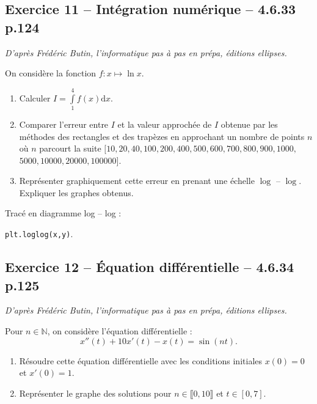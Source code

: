 \documentclass[10pt,fleqn]{article} %
\begin{document}
\begin{multicols}{2}
\subsection*{Exercice 11 -- Intégration numérique -- 4.6.33 p.124}
\begin{flushright}
\textit{D'après Frédéric Butin, l'informatique pas à pas en prépa, éditions ellipses.}
\end{flushright}

On considère la fonction $f:x \mapsto \ln x$.
\begin{enumerate}
\item Calculer $I=\int\limits_1^4 f(x) \text{d}x$.
\item Comparer l'erreur entre $I$ et la valeur approchée de $I$ obtenue par les méthodes des rectangles et des trapèzes en approchant un nombre de points $n$ où $n$ parcourt la suite $[10,20,40,100,200, 400, 500, 600, 700, 800, 900, 1000,$ $5000, 10000, 20000, 100000]$.
\item Représenter graphiquement cette erreur en prenant une échelle $\log$ -- $\log$. Expliquer les graphes obtenus.
\end{enumerate}

\begin{rem}
Tracé en diagramme log -- log :

\texttt{plt.loglog(x,y)}.
\end{rem}

\subsection*{Exercice 12 -- Équation différentielle -- 4.6.34 p.125}
\begin{flushright}
\textit{D'après Frédéric Butin, l'informatique pas à pas en prépa, éditions ellipses.}
\end{flushright}

Pour $n \in \mathbb{N}$, on considère l'équation différentielle : 
$$
x''(t) +10 x'(t) - x(t)=\sin \left( nt \right).
$$
\begin{enumerate}
\item Résoudre cette équation différentielle avec les conditions initiales $x(0)=0$ et $x'(0)=1$.
\item Représenter le graphe des solutions pour $n\in \llbracket 0,10 \rrbracket$ et $t \in[0,7]$.
\end{enumerate}


\end{multicols}
\end{document}
